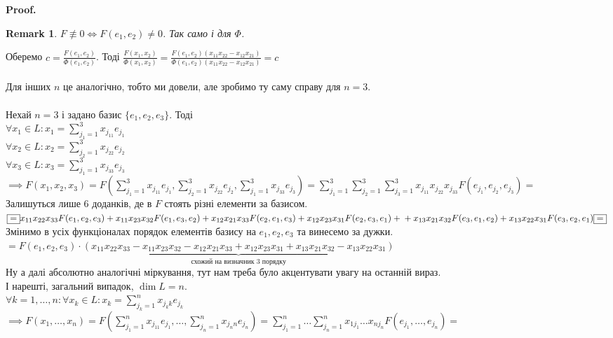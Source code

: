 \documentclass[a4paper, 10pt]{article}
\makeatletter
\def\huge{\displaystyle}
\def\qed{$\blacksquare$}
\theoremstyle{theoremdd}
\theoremstyle{theoremdd}
\theoremstyle{theoremdd}
\theoremstyle{theoremdd}
\theoremstyle{theoremdd}
\theoremstyle{theoremdd}
\newtheorem{remark}[theorem]{Remark}
\theoremstyle{theoremdd}
\theoremstyle{theoremdd}
\renewenvironment{proof}[1][Proof.\\]{\par
\pushQED{\hfill \qed}%
\normalfont \topsep6\p@\@plus6\p@\relax
\trivlist
\item\relax
{\bfseries
#1\@addpunct{.}}\hspace\labelsep\ignorespaces
}{%
\popQED\endtrivlist\@endpefalse
}
\makeatother
\begin{document}
\begin{proof}
\begin{remark}
$F \not\equiv 0 \iff F(e_1,e_2) \neq 0$. Так само і для $\Phi$.
\end{remark}
Оберемо $c = \huge \frac{F(e_1,e_2)}{\Phi(e_1,e_2)}$. Тоді $\huge \frac{F(x_1,x_2)}{\Phi(x_1,x_2)} = \frac{F(e_1,e_2)(x_{11}x_{22}-x_{12}x_{21})}{\Phi(e_1,e_2)(x_{11}x_{22}-x_{12}x_{21})} = c$\\
\\
Для інших $n$ це аналогічно, тобто ми довели, але зробимо ту саму справу для $n=3$.\\
\\
Нехай $n=3$ і задано базис $\{e_1,e_2,e_3\}$. Тоді\\
$\forall x_1 \in L: x_1 = \huge \sum_{j_1=1}^3 x_{j_11}e_{j_1}$\\
$\forall x_2 \in L: x_2 = \huge \sum_{j_2=1}^3 x_{j_22}e_{j_2}$\\
$\forall x_3 \in L: x_3 = \huge \sum_{j_1=1}^3 x_{j_33}e_{j_3}$\\
$\implies F(x_1,x_2,x_3) = \huge F\left(\sum_{j_1=1}^3 x_{j_11}e_{j_1}, \sum_{j_2=1}^3 x_{j_22}e_{j_2}, \sum_{j_1=1}^3 x_{j_33}e_{j_3}\right) = \sum_{j_1 = 1}^3 \sum_{j_2 = 1}^3 \sum_{j_3 = 1}^3 x_{j_11}x_{j_22}x_{j_33} F(e_{j_1},e_{j_2},e_{j_3}) \boxed{=}$\\
Залишуться лише 6 доданків, де в $F$ стоять різні елементи за базисом.\\
$\boxed{=} x_{11}x_{22}x_{33}F(e_1,e_2,e_3) + x_{11}x_{23}x_{32}F(e_1,e_3,e_2)+x_{12}x_{21}x_{33}F(e_2,e_1,e_3) + x_{12}x_{23}x_{31}F(e_2,e_3,e_1) + \\ + x_{13}x_{21}x_{32}F(e_3,e_1,e_2) + x_{13}x_{22}x_{31}F(e_3,e_2,e_1) \boxed{=}$\\
Змінимо в усіх функціоналах порядок елементів базису на $e_1,e_2,e_3$ та винесемо за дужки.\\
$\boxed{=} F(e_1,e_2,e_3)\cdot \underbrace{(x_{11}x_{22}x_{33} - x_{11}x_{23}x_{32} - x_{12}x_{21}x_{33} + x_{12}x_{23}x_{31} + x_{13}x_{21}x_{32} - x_{13}x_{22}x_{31})}_{\textrm{схожий на визначник 3 порядку}}$\\
Ну а далі абсолютно аналогічні міркування, тут нам треба було акцентувати увагу на останній вираз.
\bigskip \\
І нарешті, загальний випадок, $\dim L = n$.\\
$\forall k = 1,\dots,n: \forall x_k \in L: x_k = \huge \sum_{j_k=1}^{n} x_{j_kk}e_{j_k}$\\
$\implies F(x_1,\dots,x_n) = \huge F\left(\sum_{j_1=1}^{n} x_{j_11}e_{j_1}, \dots, \sum_{j_n=1}^{n} x_{j_n n}e_{j_n}\right) = \sum_{j_1 = 1}^n \dots \sum_{j_n = 1}^n x_{1j_1}\dots x_{nj_n} F(e_{j_1},\dots,e_{j_n}) \boxed{=}$\\

\end{proof}
\end{document}
